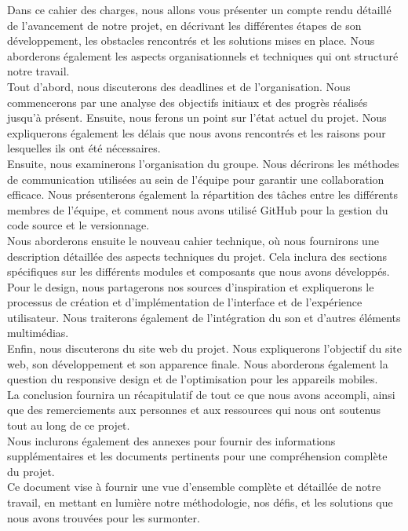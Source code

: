 Dans ce cahier des charges, nous allons vous présenter un compte rendu détaillé de l'avancement de notre projet, en décrivant les différentes étapes de son développement, les obstacles rencontrés et les solutions mises en place.
Nous aborderons également les aspects organisationnels et techniques qui ont structuré notre travail.
\\

Tout d'abord, nous discuterons des deadlines et de l'organisation.
Nous commencerons par une analyse des objectifs initiaux et des progrès réalisés jusqu'à présent.
Ensuite, nous ferons un point sur l'état actuel du projet. Nous expliquerons également les délais que nous avons rencontrés et les raisons pour lesquelles ils ont été nécessaires.
\\

Ensuite, nous examinerons l'organisation du groupe. Nous décrirons les méthodes de communication utilisées au sein de l'équipe pour garantir une collaboration efficace.
Nous présenterons également la répartition des tâches entre les différents membres de l'équipe, et comment nous avons utilisé GitHub pour la gestion du code source et le versionnage.
\\

Nous aborderons ensuite le nouveau cahier technique, où nous fournirons une description détaillée des aspects techniques du projet.
Cela inclura des sections spécifiques sur les différents modules et composants que nous avons développés.
\\

Pour le design, nous partagerons nos sources d'inspiration et expliquerons le processus de création et d'implémentation de l'interface et de l'expérience utilisateur.
Nous traiterons également de l'intégration du son et d'autres éléments multimédias.
\\

Enfin, nous discuterons du site web du projet.
Nous expliquerons l'objectif du site web, son développement et son apparence finale.
Nous aborderons également la question du responsive design et de l'optimisation pour les appareils mobiles.
\\

La conclusion fournira un récapitulatif de tout ce que nous avons accompli, ainsi que des remerciements aux personnes et aux ressources qui nous ont soutenus tout au long de ce projet.
\\

Nous inclurons également des annexes pour fournir des informations supplémentaires et les documents pertinents pour une compréhension complète du projet.
\\

Ce document vise à fournir une vue d'ensemble complète et détaillée de notre travail, en mettant en lumière notre méthodologie, nos défis, et les solutions que nous avons trouvées pour les surmonter.
